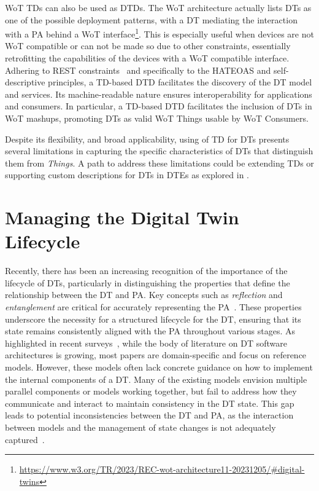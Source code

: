 \ac{WoT} \acp{TD} can also be used as \acp{DTD}.
The \ac{WoT} architecture actually lists \acp{DT} as one of the possible deployment patterns, with a \ac{DT} mediating the interaction with a \ac{PA} behind a \ac{WoT} interface\footnote{\url{https://www.w3.org/TR/2023/REC-wot-architecture11-20231205/\#digital-twins}}.
%
This is especially useful when devices are not \ac{WoT} compatible or can not be made so due to other constraints, essentially retrofitting the capabilities of the devices with a \ac{WoT} compatible interface.
%
Adhering to \ac{REST} constraints~\cite{fielding2000architectural} and specifically to the HATEOAS and self-descriptive principles, a \ac{TD}-based \ac{DTD} facilitates the discovery of the \ac{DT} model and services.
%
Its machine-readable nature ensures interoperability for applications and consumers.
%
In particular, a \ac{TD}-based \ac{DTD} facilitates the inclusion of \acp{DT} in \ac{WoT} mashups, promoting \acp{DT} as valid \ac{WoT} Things usable by \ac{WoT} Consumers.

Despite its flexibility,
and broad applicability, 
using of \ac{TD} for \acp{DT} presents several limitations in capturing the specific characteristics of \acp{DT} that distinguish them from \emph{Things}.
%
A path to address these limitations could be extending \acp{TD} or supporting custom descriptions for \acp{DT} in \acp{DTE} as explored in .


\section{Managing the Digital Twin Lifecycle}
\label{sec:dte:engineering-dt:dt-lifecycle}


Recently, there has been an increasing recognition of the importance of the lifecycle of \acp{DT},
particularly in distinguishing the properties that define the relationship between the \ac{DT} and \ac{PA}. 
%
Key concepts such as \emph{reflection} and \emph{entanglement} are critical for accurately representing the \ac{PA}~\cite{dt-IoT-context-Minerva-2020,web-of-dt-ricci-2022}.
%
These properties underscore the necessity for a structured lifecycle for the \ac{DT}, ensuring that its state remains consistently aligned with the \ac{PA} throughout various stages.
%
As highlighted in recent surveys~\cite{ferko2022architecting, 9640612,Hribernik_Cabri_Mandreoli_Mentzas_2021}, while the body of literature on \ac{DT} software architectures is growing, most papers are domain-specific and focus on reference models.
%
However, these models often lack concrete guidance on how to implement the internal components of a \ac{DT}. Many of the existing models envision multiple parallel components or models working together, but fail to address how they communicate and interact to maintain consistency in the \ac{DT} state.
This gap leads to potential inconsistencies between the \ac{DT} and \ac{PA}, as the interaction between models and the management of state changes is not adequately captured~\cite{alam2017access,Malakuti2019fourlayer,Lpez2021}.




